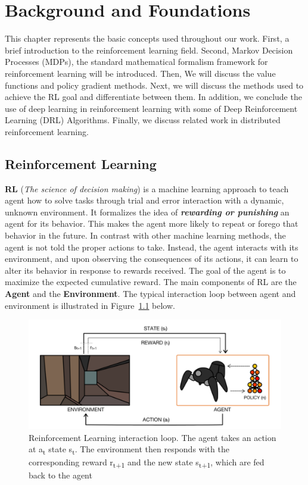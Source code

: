 
\chapter{Background and Foundations}\label{chapter:background_and_foundations}

This chapter represents the basic concepts used throughout our work. First, a brief introduction to the reinforcement learning field. Second, Markov Decision Processes (MDPs), the standard mathematical formalism framework for reinforcement learning will be introduced. Then, We will discuss the value functions and policy gradient methods. Next, we will discuss the methods used to achieve the RL goal and differentiate between them. In addition, we conclude the use of deep learning in reinforcement learning with some of Deep Reinforcement Learning (DRL) Algorithms. Finally, we discuss related work in distributed reinforcement learning.

\section{Reinforcement Learning}

\textbf{RL} (\textit{The science of decision making}) is a machine learning approach to teach agent how to solve tasks through trial and error interaction with a dynamic, unknown environment. It formalizes the idea of \textit{\textbf{rewarding or punishing}} an agent for its behavior. This makes the agent more likely to repeat or forego that behavior in the future. In contrast with other machine learning methods, the agent is not told the proper actions to take. Instead, the agent interacts with its environment, and upon observing the consequences of its actions, it can learn to alter its behavior in response to rewards received. The goal of the agent is to maximize the expected cumulative reward. The main components of RL are the \textbf{Agent} and the \textbf{Environment}. The typical interaction loop between agent and environment is illustrated in Figure~\ref{fig:agent_env} below.

\begin{figure}[!htb]
	\centering
	\includegraphics[width=.5\linewidth]{figures/Agent-Env.png}
	\caption{Reinforcement Learning interaction loop. The agent takes an action at a\textsubscript{t} state s\textsubscript{t}. The environment then responds with the corresponding reward r\textsubscript{t+1} and the new state s\textsubscript{t+1}, which are fed back to the agent~\parencite{arulkumaran2017brief}}
	\label{fig:agent_env}
\end{figure}

